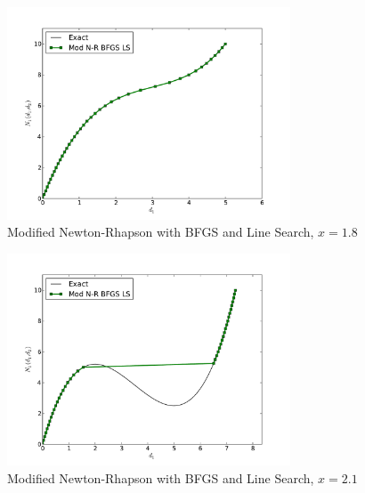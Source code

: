\documentclass[12pt]{article}
\begin{document}
\begin{figure}[h!]
\centering
\includegraphics[width=0.75\textwidth]{MNR_BFGS_LS18.pdf}
\caption{Modified Newton-Rhapson with BFGS and Line Search, $x=1.8$}
\end{figure}
\begin{figure}[h!]
\centering
\includegraphics[width=0.75\textwidth]{MNR_BFGS_LS21.pdf}
\caption{Modified Newton-Rhapson with BFGS and Line Search, $x=2.1$}
\end{figure}
\end{document}
